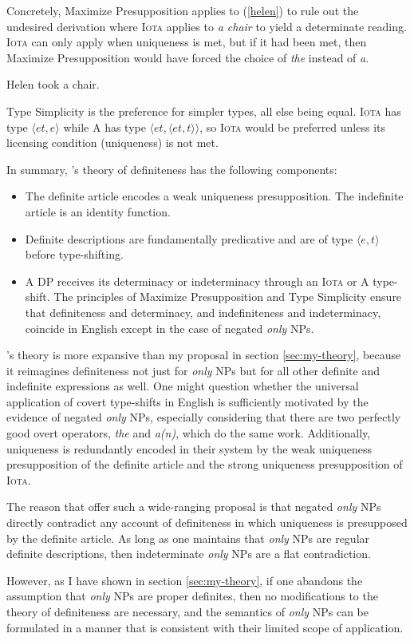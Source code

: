 Concretely, Maximize Presupposition applies to (\ref{helen}) to rule out the undesired derivation where \textsc{Iota} applies to \textit{a chair} to yield a determinate reading. \textsc{Iota} can only apply when uniqueness is met, but if it had been met, then Maximize Presupposition would have forced the choice of \textit{the} instead of \textit{a}.

\begin{exe}
	\ex \label{helen} Helen took a chair.
\end{exe}

Type Simplicity is the preference for simpler types, all else being equal. \textsc{Iota} has type $\langle et, e \rangle$ while \textsc{A} has type $\langle et, \langle et, t \rangle \rangle$, so \textsc{Iota} would be preferred unless its licensing condition (uniqueness) is not met.

In summary, \citeauthor{cb2015}'s theory of definiteness has the following components:

\begin{itemize}
	\item The definite article encodes a weak uniqueness presupposition. The indefinite article is an identity function.
	\item Definite descriptions are fundamentally predicative and are of type $\langle e, t \rangle$ before type-shifting.
	\item A DP receives its determinacy or indeterminacy through an \textsc{Iota} or \textsc{A} type-shift. The principles of Maximize Presupposition and Type Simplicity ensure that definiteness and determinacy, and indefiniteness and indeterminacy, coincide in English except in the case of negated \textit{only} NPs.
\end{itemize}

\citeauthor{cb2015}'s theory is more expansive than my proposal in section \ref{sec:my-theory}, because it reimagines definiteness not just for \textit{only} NPs but for all other definite and indefinite expressions as well. One might question whether the universal application of covert type-shifts in English is sufficiently motivated by the evidence of negated \textit{only} NPs, especially considering that there are two perfectly good overt operators, \textit{the} and \textit{a(n)}, which do the same work. Additionally, uniqueness is redundantly encoded in their system by the weak uniqueness presupposition of the definite article and the strong uniqueness presupposition of \textsc{Iota}.

The reason that \citeauthor{cb2015} offer such a wide-ranging proposal is that negated \textit{only} NPs directly contradict any account of definiteness in which uniqueness is presupposed by the definite article. As long as one maintains that \textit{only} NPs are regular definite descriptions, then indeterminate \textit{only} NPs are a flat contradiction.

However, as I have shown in section \ref{sec:my-theory}, if one abandons the assumption that \textit{only} NPs are proper definites, then no modifications to the theory of definiteness are necessary, and the semantics of \textit{only} NPs can be formulated in a manner that is consistent with their limited scope of application.